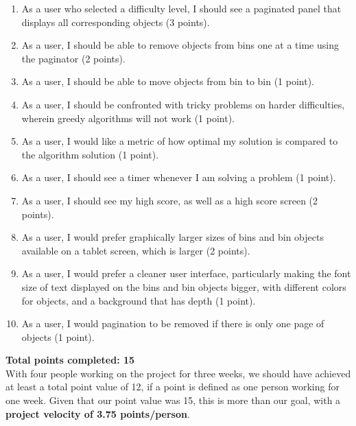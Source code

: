 \documentclass[11pt]{article}
\begin{document}
\begin{enumerate}[1.]

    \item As a user who selected a difficulty level, I should see a paginated
    panel that displays all corresponding objects (3 points).

    \item As a user, I should be able to remove objects from bins one at a time
    using the paginator (2 points).

    \item As a user, I should be able to move objects from bin to bin (1 point).

    \item As a user, I should be confronted with tricky problems on harder
    difficulties, wherein greedy algorithms will not work (1 point).

    \item As a user, I would like a metric of how optimal my solution is
    compared to the algorithm solution (1 point).

    \item As a user, I should see a timer whenever I am solving a problem (1
    point).

    \item As a user, I should see my high score, as well as a high score screen
    (2 points).

    \item As a user, I would prefer graphically larger sizes of bins and bin
    objects available on a tablet screen, which is larger (2 points).

    \item As a user, I would prefer a cleaner user interface, particularly
    making the font size of text displayed on the bins and bin objects bigger,
    with different colors for objects, and a background that has depth (1
    point).

    \item As a user, I would pagination to be removed if there is only one page
    of objects (1 point).

\end{enumerate}

\textbf{Total points completed:  15} \\

With four people working on the project for three weeks, we should have achieved
at least a total point value of 12, if a point is defined as one person working
for one week.  Given that our point value was 15, this is more than our goal,
with a \textbf{project velocity of 3.75 points/person}.
\end{document}

